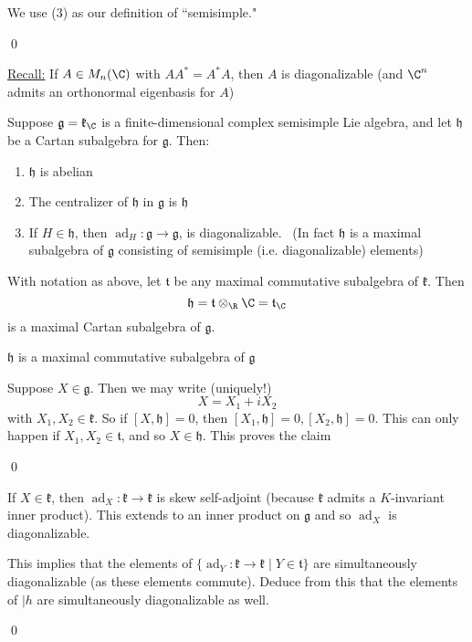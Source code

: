 \documentclass[x11names,reqno,14pt]{extarticle}
\newcommand{\mk}[1]{\mathfrak{#1}}
\newcommand{\g}{\mk{g}}
\newcommand{\h}{\mk{h}}
\DeclareMathOperator{\ad}{ad}
\begin{document}
We use (3) as our definition of ``semisimple."

\proof

\qed

\underline{Recall:} If $A \in M_n(\C)$ with $AA^* = A^*A$, then $A$ is diagonalizable (and $\C^n$ admits an orthonormal eigenbasis for $A$) 

\thm

Suppose $\g = \mk{k}_\C$ is a finite-dimensional complex semisimple Lie algebra, and let $\h$ be a Cartan subalgebra for $\g$. Then:
\begin{enumerate}

\item $\h$ is abelian

\item The centralizer of $\h$ in $\g$ is $\h$

\item If $H\in\h$, then $\ad_H:\g\to\g$, is diagonalizable. 
\,
(In fact $\h$ is a maximal subalgebra of $\g$ consisting of semisimple (i.e. diagonalizable) elements)

\end{enumerate}

\thm

With notation as above, let $\mk{t}$ be any maximal commutative subalgebra of $\mk{k}$. Then 
\[
\h = \mk{t}\otimes_\R\C = \mk{t}_\C
\]
is a maximal Cartan subalgebra of $\g$. 

\proof

\claim

$\h$ is a maximal commutative subalgebra of $\g$

\proof

Suppose $X \in \g$. Then we may write (uniquely!)
\[
X = X_1 + i X_2
\]
with $X_1, X_2\in\mk{k}$. So if $[X,\h] = 0$, then $[X_1,\h]=0,[X_2,\h]=0$. This can only happen if $X_1, X_2 \in \mk{t}$, and so $X \in \h$. This proves the claim 

\qed

If $X \in \mk{k}$, then $\ad_X:\mk{k}\to\mk{k}$ is skew self-adjoint (because $\mk{k}$ admits a $K$-invariant inner product). This extends to an inner product on $\g$ and so $\ad_X$ is diagonalizable. 

This implies that the elements of $\{\ad_Y:\mk{k}\to\mk{k}\mid Y \in \mk{t}\}$ are simultaneously diagonalizable (as these elements commute). Deduce from this that the elements of $|h$ are simultaneously diagonalizable as well. 

\qed

\end{document}
